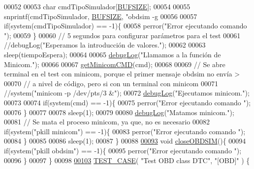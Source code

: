 \begin{DoxyCode}
{{00052 
00053     \textcolor{keywordtype}{char} cmdTipoSimulador[\hyperlink{UnitTestCase_8cpp_aeca034f67218340ecb2261a22c2f3dcd}{BUFSIZE}];
00054 
00055     snprintf(cmdTipoSimulador, \hyperlink{UnitTestCase_8cpp_aeca034f67218340ecb2261a22c2f3dcd}{BUFSIZE}, \textcolor{stringliteral}{"obdsim -g %
00056 
00057     \textcolor{keywordflow}{if}(system(cmdTipoSimulador) == -1)\{
00058         perror(\textcolor{stringliteral}{"Error ejecutando comando "});
00059     \}
00060     \textcolor{comment}{// 5 segundos para configurar parámetros para el test}
00061     \textcolor{comment}{//debugLog("Esperamos la introducción de valores.");}
00062 
00063     sleep(tiempoEspera);
00064 
00065     \hyperlink{debug_8hpp_a55f41cf7b0585224496de3d7adbc101c}{debugLog}(\textcolor{stringliteral}{"Llamamos a la función de Minicom."});
00066 
00067     \hyperlink{UnitTestCase_8cpp_ae9f15809d7998bb4a7404d34bb87a5e3}{getMinicomCMD}(cmd);
00068 
00069     \textcolor{comment}{// Se abre terminal en el test con minicom, porque el primer mensaje obdsim no envía >}
00070     \textcolor{comment}{// a nivel de código, pero si con un terminal con minicom}
00071     \textcolor{comment}{//system("minicom -p /dev/pts/3 &");}
00072     \hyperlink{debug_8hpp_a55f41cf7b0585224496de3d7adbc101c}{debugLog}(\textcolor{stringliteral}{"Ejecutamos minicom."});
00073 
00074     \textcolor{keywordflow}{if}(system(cmd) == -1)\{
00075         perror(\textcolor{stringliteral}{"Error ejecutando comando "});
00076     \}
00077 
00078     sleep(1);
00079 
00080     \hyperlink{debug_8hpp_a55f41cf7b0585224496de3d7adbc101c}{debugLog}(\textcolor{stringliteral}{"Matamos minicom."});
00081     \textcolor{comment}{// Se mata el proceso minicom, ya que, no es necesario}
00082     \textcolor{keywordflow}{if}(system(\textcolor{stringliteral}{"pkill minicom"}) == -1)\{
00083         perror(\textcolor{stringliteral}{"Error ejecutando comando "});
00084     \}
00085 
00086     sleep(1);
00087 \}
00088 
\hyperlink{UnitTestCase_8cpp_ad24bf860f798931c63aaa488e08b8b4e}{00093} \textcolor{keywordtype}{void} \hyperlink{UnitTestCase_8cpp_ad24bf860f798931c63aaa488e08b8b4e}{closeOBDSIM}()\{
00094     \textcolor{keywordflow}{if}(system(\textcolor{stringliteral}{"pkill obdsim"}) == -1)\{
00095         perror(\textcolor{stringliteral}{"Error ejecutando comando "});
00096     \}
00097 \}
00098 
\hyperlink{UnitTestCase_8cpp_ab1b7b485076e7de68cd9912827a8ee86}{00103} \hyperlink{UnitTestCase_8cpp_ab1b7b485076e7de68cd9912827a8ee86}{TEST\_CASE}( \textcolor{stringliteral}{"Test OBD class DTC"}, \textcolor{stringliteral}{"[OBD]"} ) \{
}}}
\end{DoxyCode}
